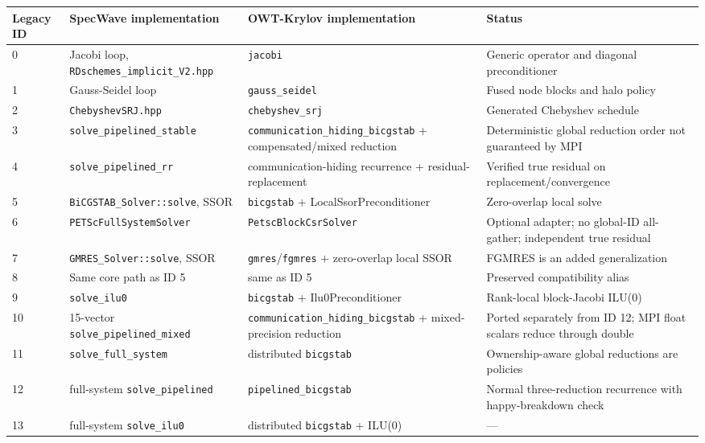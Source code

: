 \documentclass[11pt,a4paper]{report}
\begin{document}
\begin{longtable}{C{0.06\textwidth}P{0.26\textwidth}P{0.28\textwidth}P{0.28\textwidth}}
\toprule
Legacy ID & SpecWave implementation & OWT-Krylov implementation & Status \\
\midrule
{} & Jacobi loop, \texttt{RDschemes\_implicit\_V2.hpp} & \lstinline!jacobi! & Generic operator and diagonal preconditioner \\
1 & Gauss-Seidel loop & \lstinline!gauss_seidel! & Fused node blocks and halo policy \\
2 & \texttt{ChebyshevSRJ.hpp} & \lstinline!chebyshev_srj! & Generated Chebyshev schedule \\
3 & \lstinline!solve_pipelined_stable! & \lstinline!communication_hiding_bicgstab! + compensated/mixed reduction & Deterministic global reduction order not guaranteed by MPI \\
4 & \lstinline!solve_pipelined_rr! & communication-hiding recurrence + residual-replacement & Verified true residual on replacement/convergence \\
5 & \lstinline!BiCGSTAB_Solver::solve!, SSOR & \lstinline!bicgstab! + LocalSsorPreconditioner & Zero-overlap local solve \\
6 & \lstinline!PETScFullSystemSolver! & \lstinline!PetscBlockCsrSolver! & Optional adapter; no global-ID all-gather; independent true residual \\
7 & \lstinline!GMRES_Solver::solve!, SSOR & \lstinline!gmres!/\lstinline!fgmres! + zero-overlap local SSOR & FGMRES is an added generalization \\
8 & Same core path as ID 5 & same as ID 5 & Preserved compatibility alias \\
9 & \lstinline!solve_ilu0! & \lstinline!bicgstab! + Ilu0Preconditioner & Rank-local block-Jacobi ILU(0) \\
10 & 15-vector \lstinline!solve_pipelined_mixed! & \lstinline!communication_hiding_bicgstab! + mixed-precision reduction & Ported separately from ID 12; MPI float scalars reduce through double \\
11 & \lstinline!solve_full_system! & distributed \lstinline!bicgstab! & Ownership-aware global reductions are policies \\
12 & full-system \lstinline!solve_pipelined! & \lstinline!pipelined_bicgstab! & Normal three-reduction recurrence with happy-breakdown check \\
13 & full-system \lstinline!solve_ilu0! & distributed \lstinline!bicgstab! + ILU(0) & --- \\

\end{longtable}
\end{document}
